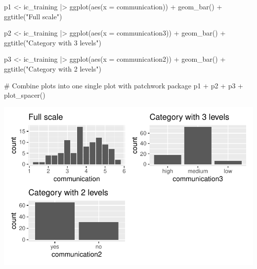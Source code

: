 \documentclass[
  letterpaper,
]{krantz}
\makeatletter
\newenvironment{Shaded}{\begin{snugshade}}{\end{snugshade}}
\newcommand{\AttributeTok}[1]{\textcolor[rgb]{0.40,0.45,0.13}{#1}}
\newcommand{\CommentTok}[1]{\textcolor[rgb]{0.37,0.37,0.37}{#1}}
\newcommand{\FunctionTok}[1]{\textcolor[rgb]{0.28,0.35,0.67}{#1}}
\newcommand{\NormalTok}[1]{\textcolor[rgb]{0.00,0.23,0.31}{#1}}
\newcommand{\OtherTok}[1]{\textcolor[rgb]{0.00,0.23,0.31}{#1}}
\newcommand{\SpecialCharTok}[1]{\textcolor[rgb]{0.37,0.37,0.37}{#1}}
\newcommand{\StringTok}[1]{\textcolor[rgb]{0.13,0.47,0.30}{#1}}
\newenvironment{kframe}{%
\medskip{}
\setlength{\fboxsep}{.8em}
 \def\at@end@of@kframe{}%
 \ifinner\ifhmode%
  \def\at@end@of@kframe{\end{minipage}}%
  \begin{minipage}{\columnwidth}%
 \fi\fi%
 \def\FrameCommand##1{\hskip\@totalleftmargin \hskip-\fboxsep
 \colorbox{shadecolor}{##1}\hskip-\fboxsep
     \hskip-\linewidth \hskip-\@totalleftmargin \hskip\columnwidth}%
 \MakeFramed {\advance\hsize-\width
   \@totalleftmargin\z@ \linewidth\hsize
   \@setminipage}}%
 {\par\unskip\endMakeFramed%
 \at@end@of@kframe}
\renewenvironment{Shaded}{\begin{kframe}}{\end{kframe}}
\makeatother
\begin{document}
\begin{Shaded}
\begin{Highlighting}[]
\NormalTok{p1 }\OtherTok{\textless{}{-}}
\NormalTok{  ic\_training }\SpecialCharTok{|\textgreater{}}
  \FunctionTok{ggplot}\NormalTok{(}\FunctionTok{aes}\NormalTok{(}\AttributeTok{x =}\NormalTok{ communication)) }\SpecialCharTok{+}
  \FunctionTok{geom\_bar}\NormalTok{() }\SpecialCharTok{+}
  \FunctionTok{ggtitle}\NormalTok{(}\StringTok{"Full scale"}\NormalTok{)}

\NormalTok{p2 }\OtherTok{\textless{}{-}}
\NormalTok{  ic\_training }\SpecialCharTok{|\textgreater{}}
  \FunctionTok{ggplot}\NormalTok{(}\FunctionTok{aes}\NormalTok{(}\AttributeTok{x =}\NormalTok{ communication3)) }\SpecialCharTok{+}
  \FunctionTok{geom\_bar}\NormalTok{() }\SpecialCharTok{+}
  \FunctionTok{ggtitle}\NormalTok{(}\StringTok{"Category with 3 levels"}\NormalTok{)}

\NormalTok{p3 }\OtherTok{\textless{}{-}}
\NormalTok{  ic\_training }\SpecialCharTok{|\textgreater{}}
  \FunctionTok{ggplot}\NormalTok{(}\FunctionTok{aes}\NormalTok{(}\AttributeTok{x =}\NormalTok{ communication2)) }\SpecialCharTok{+}
  \FunctionTok{geom\_bar}\NormalTok{() }\SpecialCharTok{+}
  \FunctionTok{ggtitle}\NormalTok{(}\StringTok{"Category with 2 levels"}\NormalTok{)}

\CommentTok{\# Combine plots into one single plot with \textquotesingle{}patchwork\textquotesingle{} package}
\NormalTok{p1 }\SpecialCharTok{+}\NormalTok{ p2 }\SpecialCharTok{+}\NormalTok{ p3 }\SpecialCharTok{+} \FunctionTok{plot\_spacer}\NormalTok{()}
\end{Highlighting}
\end{Shaded}

\includegraphics{11_group_comparison_files/figure-pdf/comparing-categorical-vs-numerical-1.pdf}
\end{document}
